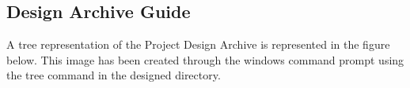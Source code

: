 \begin{appendices}
\clearpage


\clearpage
\section{Design Archive Guide}
\label{archive}
A tree representation of the Project Design Archive is represented in the figure below. This image has been created through the windows command prompt using the tree command in the designed directory.
\begin{figure}[ht!]%
    \centering

\end{figure}
\end{appendices}
